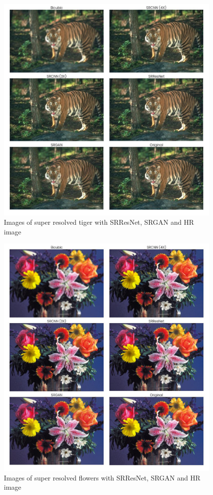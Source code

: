     \begin{figure}
        \centering
        \includegraphics[width=5.5in]{./figures/examples/tiger.jpg}
        \caption{Images of super resolved tiger with SRResNet, SRGAN and HR image}
    \end{figure}
    \newpage
    \begin{figure}
        \centering
        \includegraphics[width=5.5in]{./figures/examples/flowers.jpg}
        \caption{Images of super resolved flowers  with SRResNet, SRGAN and HR image}
    \end{figure}       
  
